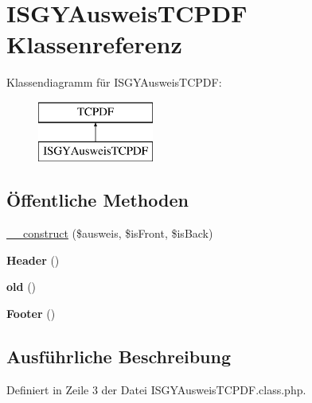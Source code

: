 \hypertarget{class_i_s_g_y_ausweis_t_c_p_d_f}{}\section{I\+S\+G\+Y\+Ausweis\+T\+C\+P\+DF Klassenreferenz}
\label{class_i_s_g_y_ausweis_t_c_p_d_f}
Klassendiagramm für I\+S\+G\+Y\+Ausweis\+T\+C\+P\+DF\+:\begin{figure}[H]
\begin{center}
\leavevmode
\includegraphics[height=2.000000cm]{class_i_s_g_y_ausweis_t_c_p_d_f}
\end{center}
\end{figure}
\subsection*{Öffentliche Methoden}
\begin{DoxyCompactItemize}
\item 
\mbox{\hyperlink{class_i_s_g_y_ausweis_t_c_p_d_f_a9326dfeda1bfaffb545e180e2790a73a}{\+\_\+\+\_\+construct}} (\$ausweis, \$is\+Front, \$is\+Back)
\item 
\mbox{\label{class_i_s_g_y_ausweis_t_c_p_d_f_a9816a69096e3cf0f471cf6ce772d8acc}} 
{\bfseries Header} ()
\item 
\mbox{\label{class_i_s_g_y_ausweis_t_c_p_d_f_a8930891bfce34505702829a42fe37995}} 
{\bfseries old} ()
\item 
\mbox{\label{class_i_s_g_y_ausweis_t_c_p_d_f_af374891620877e9cc5325dc56b000b1c}} 
{\bfseries Footer} ()
\end{DoxyCompactItemize}


\subsection{Ausführliche Beschreibung}


Definiert in Zeile 3 der Datei I\+S\+G\+Y\+Ausweis\+T\+C\+P\+D\+F.\+class.\+php.



